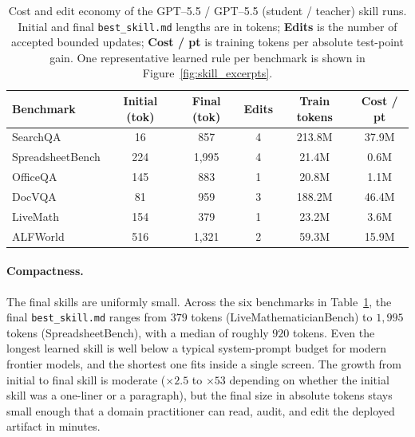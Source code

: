 \documentclass{llmxive}
\providecommand{\arraystretch}{1.0}
\begin{document}
\begin{table}[t]
\centering
\footnotesize
\setlength{\tabcolsep}{5pt}
\renewcommand{\arraystretch}{0.95}
\begin{tabular}{l c c c c c}
\toprule
\textbf{Benchmark} & \textbf{Initial (tok)} & \textbf{Final (tok)} & \textbf{Edits} & \textbf{Train tokens} & \textbf{Cost / pt} \\
\midrule
SearchQA         & 16  & 857     & 4 & 213.8M & 37.9M \\
SpreadsheetBench & 224 & 1{,}995 & 4 & 21.4M  & 0.6M  \\
OfficeQA         & 145 & 883     & 1 & 20.8M  & 1.1M  \\
DocVQA           & 81  & 959     & 3 & 188.2M & 46.4M \\
LiveMath         & 154 & 379     & 1 & 23.2M  & 3.6M  \\
ALFWorld         & 516 & 1{,}321 & 2 & 59.3M  & 15.9M \\
\bottomrule
\end{tabular}
\caption{Cost and edit economy of the GPT--5.5 / GPT--5.5 (student / teacher) skill runs. Initial and final \texttt{best\_skill.md} lengths are in tokens; \textbf{Edits} is the number of accepted bounded updates; \textbf{Cost / pt} is training tokens per absolute test-point gain. One representative learned rule per benchmark is shown in Figure~\ref{fig:skill_excerpts}.}
\label{tab:skill_cost_case}
\end{table}

\paragraph{Compactness.}
The final skills are uniformly small. Across the six benchmarks in Table~\ref{tab:skill_cost_case}, the final \texttt{best\_skill.md} ranges from $379$ tokens (LiveMathematicianBench) to $1{,}995$ tokens (SpreadsheetBench), with a median of roughly $920$ tokens. Even the longest learned skill is well below a typical system-prompt budget for modern frontier models, and the shortest one fits inside a single screen. The growth from initial to final skill is moderate ($\times 2.5$ to $\times 53$ depending on whether the initial skill was a one-liner or a paragraph), but the final size in absolute tokens stays small enough that a domain practitioner can read, audit, and edit the deployed artifact in minutes.
\end{document}
